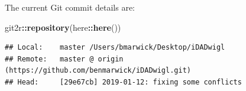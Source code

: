 \documentclass[]{elsarticle} %
\newenvironment{Shaded}{\begin{snugshade}}{\end{snugshade}}
\newcommand{\KeywordTok}[1]{\textcolor[rgb]{0.13,0.29,0.53}{\textbf{#1}}}
\newcommand{\NormalTok}[1]{#1}
\newcommand{\OperatorTok}[1]{\textcolor[rgb]{0.81,0.36,0.00}{\textbf{#1}}}
\begin{document}
The current Git commit details are:

\begin{Shaded}
\begin{Highlighting}[]
\NormalTok{git2r}\OperatorTok{::}\KeywordTok{repository}\NormalTok{(here}\OperatorTok{::}\KeywordTok{here}\NormalTok{())}
\end{Highlighting}
\end{Shaded}

\begin{verbatim}
## Local:    master /Users/bmarwick/Desktop/iDADwigl
## Remote:   master @ origin (https://github.com/benmarwick/iDADwigl.git)
## Head:     [29e67cb] 2019-01-12: fixing some conflicts
\end{verbatim}
\end{document}
